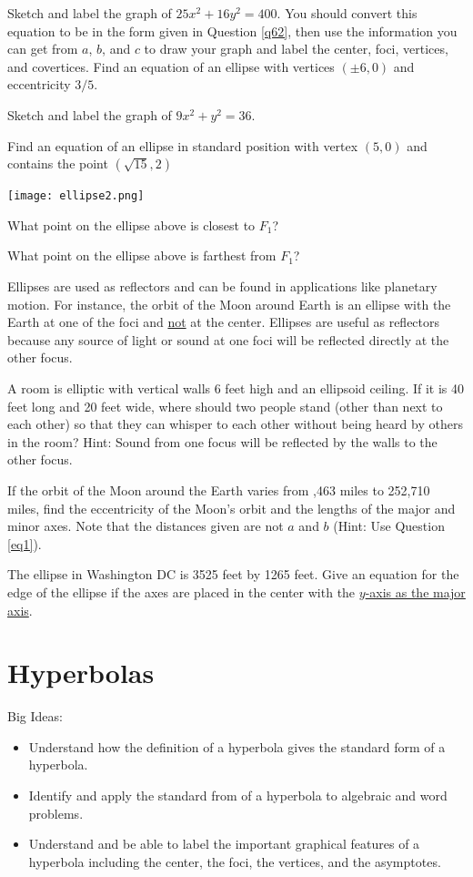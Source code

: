 \bq Sketch and label the graph of $25x^2+16y^2=400$. You should convert this equation to be in the form given in Question \ref{q62}, then use the information you can get from $a$, $b$, and $c$ to draw your graph and label the center, foci, vertices, and covertices.
\eq
\bq Find an equation of an ellipse with vertices $(\pm 6,0)$ and eccentricity $3/5$. \eq

\bq Sketch and label the graph of $9x^2+y^2=36$. \eq

\bq Find an equation of an ellipse in standard position with vertex $(5,0)$ and contains the point $(\sqrt{15},2)$ \eq

\begin{center} \texttt{[image: ellipse2.png]} \end{center}
\bq\label{eq1}
\be
\item What point on the ellipse above is closest to $F_1$?
\item What point on the ellipse above is farthest from $F_1$?
\ee
\eq
\begin{info} Ellipses are used as reflectors and can be found in applications like planetary motion. For instance, the orbit of the Moon around Earth is an ellipse with the Earth at one of the foci and \underline{not} at the center. Ellipses are useful as reflectors because any source of light or sound at one foci will be reflected directly at the other focus. \end{info}

\bq A room is elliptic with vertical walls 6 feet high and an ellipsoid ceiling. If it is 40 feet long and 20 feet wide, where should two people stand (other than next to each other) so that they can whisper to each other without being heard by others in the room? Hint: Sound from one focus will be reflected by the walls to the other focus.
\eq

\bq If the orbit of the Moon around the Earth varies from ,463 miles to 252,710 miles, find the eccentricity of the Moon's orbit and the lengths of the major and minor axes. Note that the distances given are not $a$ and $b$ (Hint: Use Question \ref{eq1}).
\eq

\bq The ellipse in Washington DC is 3525 feet by 1265 feet. Give an equation for the edge of the ellipse if the axes are placed in the center with the \underline{$y$-axis as the major axis}. \eq

\section{Hyperbolas}
Big Ideas:
\begin{itemize}
\item Understand how the definition of a hyperbola gives the standard form of a hyperbola.
\item Identify and apply the standard from of a hyperbola to algebraic and word problems.
\item Understand and be able to label the important graphical features of a hyperbola including the center, the foci, the vertices, and the asymptotes.
\end{itemize}

